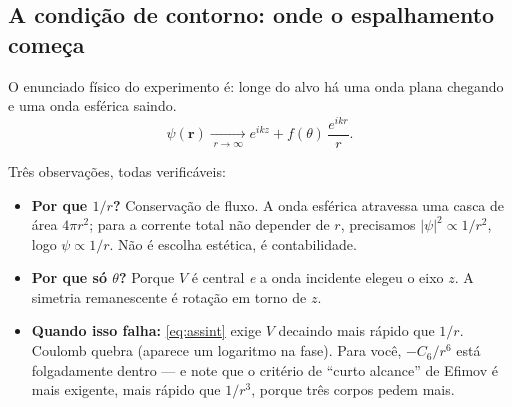 \documentclass[11pt,a4paper]{article}
\renewcommand{\vec}[1]{\mathbf{#1}}
\begin{document}
\subsection{A condição de contorno: onde o espalhamento começa}

O enunciado físico do experimento é: longe do alvo há uma onda plana chegando e uma
onda esférica saindo.
\begin{equation}
\psi(\vec r) \xrightarrow[\;r\to\infty\;]{}
e^{ikz} + f(\theta)\,\frac{e^{ikr}}{r}.
\label{eq:assint}
\end{equation}

\begin{center}
\end{center}

Três observações, todas verificáveis:

\begin{itemize}[leftmargin=*, itemsep=2pt]
\item \textbf{Por que $1/r$?} Conservação de fluxo. A onda esférica atravessa uma casca
de área $4\pi r^{2}$; para a corrente total não depender de $r$, precisamos
$|\psi|^{2}\propto 1/r^{2}$, logo $\psi\propto 1/r$. Não é escolha estética, é
contabilidade.
\item \textbf{Por que só $\theta$?} Porque $V$ é central \emph{e} a onda incidente
elegeu o eixo $z$. A simetria remanescente é rotação em torno de $z$.
\item \textbf{Quando isso falha:} \eqref{eq:assint} exige $V$ decaindo mais rápido que
$1/r$. Coulomb quebra (aparece um logaritmo na fase). Para você, $-C_{6}/r^{6}$ está
folgadamente dentro — e note que o critério de ``curto alcance'' de Efimov é mais
exigente, mais rápido que $1/r^{3}$, porque três corpos pedem mais.
\end{itemize}
\end{document}

